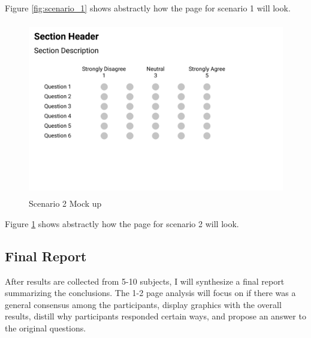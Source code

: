 \documentclass{article}
\begin{document}
Figure \ref{fig:scenario_1} shows abstractly how the page for scenario 1 will
look.

\begin{figure}[H]
\centering
\includegraphics[height=3in]{imgs/scenario_2.png}
\caption{Scenario 2 Mock up}
\label{fig:scenario_2}
\end{figure}

Figure \ref{fig:scenario_2} shows abstractly how the page for scenario 2 will
look.

\subsection{Final Report}
After results are collected from 5-10 subjects, I will synthesize a final report
summarizing the conclusions. The 1-2 page analysis will focus on if there was a
general consensus among the participants, display graphics with the overall
results, distill why participants responded certain ways, and propose an answer
to the original questions.
\end{document}
